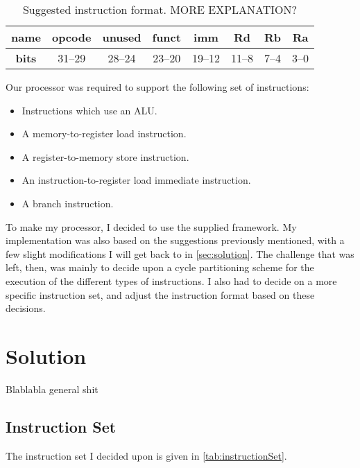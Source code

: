 \documentclass[11pt]{article}
\begin{document}
\begin{table}[htbp]
  \centering
  \begin{tabular}{|c|c|c|c|c|c|c|c|}
    \hline
    {\bf name} & opcode & unused & funct & imm & Rd & Rb & Ra \\ \hline
    {\bf bits} & 31--29 & 28--24 & 23--20 & 19--12 & 11--8 & 7--4 & 3--0 \\ \hline
  \end{tabular}
  \caption{Suggested instruction format. MORE EXPLANATION?}
  \label{tab:suggestedFormat}
\end{table}


Our processor was required to support the following set of instructions:
\begin{itemize}
\item Instructions which use an ALU.
\item A memory-to-register load instruction.
\item A register-to-memory store instruction.
\item An instruction-to-register load immediate instruction.
\item A branch instruction.
\end{itemize}

To make my processor, I decided to use the supplied framework. My
implementation was also based on the suggestions previously mentioned,
with a few slight modifications I will get back to in
\autoref{sec:solution}. The challenge that was left, then, was mainly
to decide upon a cycle partitioning scheme for the execution of the
different types of instructions. I also had to decide on a more
specific instruction set, and adjust the instruction format based on
these decisions.

\section{Solution}
\label{sec:solution}
Blablabla general shit

\subsection{Instruction Set}
\label{subsec:instructionSet}
The instruction set I decided upon is given in \autoref{tab:instructionSet}.
\end{document}
